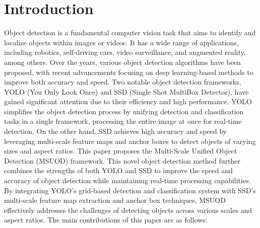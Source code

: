 \documentclass[conference]{IEEEtran}
\begin{document}
\section{Introduction}
Object detection is a fundamental computer vision task that aims to identify and localize objects within images or videos\cite{b3}. It has a wide range of applications, including robotics, self-driving cars\cite{b7}, video surveillance, and augmented reality, among others. Over the years, various object detection algorithms have been proposed\cite{b2}, with recent advancements focusing on deep learning-based methods to improve both accuracy and speed.
Two notable object detection frameworks, YOLO (You Only Look Once) and SSD (Single Shot MultiBox Detector), have gained significant attention due to their efficiency and high performance\cite{b1}. YOLO simplifies the object detection process by unifying detection and classification tasks in a single framework\cite{b6}, processing the entire image at once for real-time detection\cite{b7}. On the other hand, SSD achieves high accuracy and speed by leveraging multi-scale feature maps and anchor boxes to detect objects of varying sizes and aspect ratios\cite{b1}.
This paper proposes the Multi-Scale Unified Object Detection (MSUOD) framework\cite{b5}. This novel object detection method further combines the strengths of both YOLO and SSD to improve the speed and accuracy of object detection while maintaining real-time processing capabilities. By integrating YOLO's grid-based detection and classification system with SSD's multi-scale feature map extraction and anchor box techniques\cite{b4}, MSUOD effectively addresses the challenges of detecting objects across various scales and aspect ratios.
The main contributions of this paper are as follows:
\end{document}
